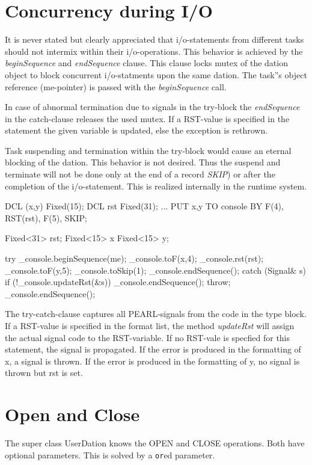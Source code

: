 \section{Concurrency during I/O}
\label{ioconcurrency}
It is never stated but clearly appreciated that i/o-statements from
different tasks should not intermix within their i/o-operations.
This behavior is achieved by the {\em beginSequence} and 
{\em endSequence} clause. 
This clause locks mutex of the dation object to block concurrent
i/o-statments upon the same dation.
The task''s object reference (me-pointer) is passed with
the {\em beginSequence} call.

In case of abnormal termination due to signals in the try-block
the {\em endSequence} in the catch-clause releases the used mutex.
If a RST-value is specified in the statement the given variable is
updated, else the exception is rethrown.

Task suspending and termination within the try-block would cause an
eternal blocking of the dation. 
This behavior is not desired.
Thus the suspend and terminate will not be done only at the end of a record
{\em SKIP}) or after the completion of the i/o-statement.
This is realized internally in the runtime system.

\begin{PEARLCode}
DCL (x,y) Fixed(15);
DCL rst Fixed(31);
...
PUT x,y TO console BY F(4), RST(rst), F(5), SKIP;
\end{PEARLCode}

\begin{CppCode}
Fixed<31> rst;
Fixed<15> x
Fixed<15> y;

try {
   _console.beginSequence(me);
   _console.toF(x,4);
   _console.rst(rst);
   _console.toF(y,5);
   _console.toSkip(1);
   _console.endSequence();
} catch (Signal& s) {
   if (!_console.updateRst(&s)) {
      _console.endSequence();
      throw;
   }
   _console.endSequence();
}
\end{CppCode}

The try-catch-clause captures all PEARL-signals from the code in the 
type block. If a RST-value is specified in the format list, the method
{\em updateRst} will assign the actual signal code to the RST-variable.
If no RST-vale is specfied for this statement, the signal is propagated.
If the error is produced in the formatting of x, a signal is thrown.
If the error is produced in the formatting of y, no signal is thrown but rst
is set.

\section{Open and Close}
The super class UserDation knows the OPEN and CLOSE operations.
Both have optional parameters. This is solved by a \verb|or|ed
parameter.

